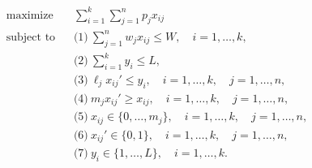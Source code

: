 \begin{align}
\text{maximize} \quad & \sum_{i=1}^k \sum_{j = 1}^n p_{j} x_{ij} \\
\text{subject to} \: & \text{(1)} \: \sum_{j=1}^n w_{j} x_{ij} \leq W, \quad i = 1, \ldots, k, \\
& \text{(2)} \: \sum_{i=1}^k y_i \leq L, \\
& \text{(3)} \: \ell_j x_{ij}' \leq y_i, \quad i = 1, \ldots, k, \quad j = 1, \ldots, n, \\
& \text{(4)} \: m_j x_{ij}' \geq x_{ij}, \quad i = 1, \ldots, k, \quad j = 1, \ldots, n, \\
& \text{(5)} \: x_{ij} \in \lbrace 0, \ldots, m_j \rbrace , \quad i = 1, \ldots, k, \quad j = 1, \ldots, n, \\
& \text{(6)} \: x_{ij}' \in \lbrace 0, 1 \rbrace , \quad i = 1, \ldots, k, \quad j = 1, \ldots, n, \\
& \text{(7)} \: y_i \in \lbrace 1, \ldots, L \rbrace , \quad i = 1, \ldots, k.
\end{align} 
